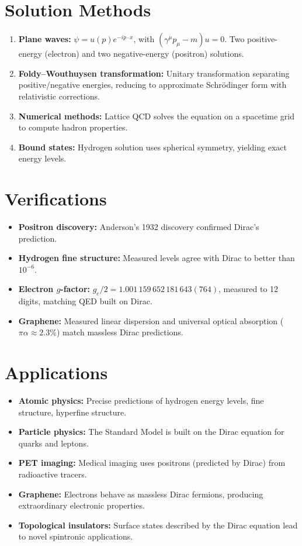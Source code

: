 \section*{Solution Methods}

\begin{enumerate}
\item \textbf{Plane waves:} $\psi = u(p) e^{-ip \cdot x}$, with $(\gamma^\mu p_\mu - m) u = 0$. Two positive-energy (electron) and two negative-energy (positron) solutions.
\item \textbf{Foldy--Wouthuysen transformation:} Unitary transformation separating positive/negative energies, reducing to approximate Schr\"odinger form with relativistic corrections.
\item \textbf{Numerical methods:} Lattice QCD solves the equation on a spacetime grid to compute hadron properties.
\item \textbf{Bound states:} Hydrogen solution uses spherical symmetry, yielding exact energy levels.
\end{enumerate}
\section*{Verifications}

\begin{itemize}
\item \textbf{Positron discovery:} Anderson's 1932 discovery confirmed Dirac's prediction.
\item \textbf{Hydrogen fine structure:} Measured levels agree with Dirac to better than $10^{-6}$.
\item \textbf{Electron $g$-factor:} $g_e/2 = 1.001\,159\,652\,181\,643(764)$, measured to 12 digits, matching QED built on Dirac.
\item \textbf{Graphene:} Measured linear dispersion and universal optical absorption ($\pi\alpha \approx 2.3\%$) match massless Dirac predictions.
\end{itemize}
\section*{Applications}

\begin{itemize}
\item \textbf{Atomic physics:} Precise predictions of hydrogen energy levels, fine structure, hyperfine structure.
\item \textbf{Particle physics:} The Standard Model is built on the Dirac equation for quarks and leptons.
\item \textbf{PET imaging:} Medical imaging uses positrons (predicted by Dirac) from radioactive tracers.
\item \textbf{Graphene:} Electrons behave as massless Dirac fermions, producing extraordinary electronic properties.
\item \textbf{Topological insulators:} Surface states described by the Dirac equation lead to novel spintronic applications.
\end{itemize}
